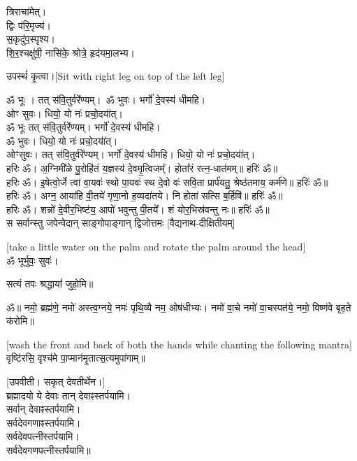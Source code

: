 त्रिराचा॑मेत्।\\
द्विः प॑रि॒मृज्य॑।\\
स॒कृदु॑प॒स्पृश्य।\\
शि॒र॒श्चक्षु॑षी॒ नासि॑के॒ श्रोत्रे॒ हृद॑यमा॒लभ्य।

उपस्थं॑ कृ॒त्वा।{\scriptsize [Sit with right leg on top of the left leg]}

ॐ भूः । तत् स॑वि॒तुर्वरे॑॑ण्यम्।\
ॐ भुवः। भर्गो॑ दे॒वस्य॑ धीमहि।\\
ओꣳ सुवः। धियो॒ यो नः॑ प्रचो॒दया॑॑त्।\\
ॐ भूः तत् स॑वि॒तुर्वरे॑॑ण्यम्। भर्गो॑ दे॒वस्य॑ धीमहि।\\
ॐ भुवः। धियो॒ यो नः॑ प्रचो॒दया॑॑त्।\\
ओꣳसुवः। तत् स॑वि॒तुर्वरे॑॑ण्यम्। भर्गो॑ दे॒वस्य॑ धीमहि। धियो॒ यो नः॑ प्रचो॒दया॑॑त्।\\

हरिः ॐ। अ॒ग्निमी᳚ळे पु॒रोहि॑तं य॒ज्ञस्य॑ दे॒वमृ॒त्विजम्᳚। होता᳚रं रत्न॒-धात॑मम्॥ हरिः॑ ॐ॥\\

हरिः ॐ। इ॒षेत्वो॒र्जे त्वा॑ वा॒यवः॑ स्थो पा॒यवः॑ स्थ दे॒वो वः॑ सवि॒ता प्रार्प॑यतु॒ श्रेष्ठ॑तमाय॒ कर्म॑णे॥ हरिः॑ ॐ॥ \\

हरिः ॐ। अग्न॒ आया॑हि वी॒तये॑ गृणा॒नो ह॒व्यदा॑तये। नि होता॑ सत्सि ब॒र्हिषि॑॥ हरिः॑ ॐ॥\\

हरिः ॐ। शन्नो॑ दे॒वीर॒भिष्ट॑य॒ आपो॑ भवुन्तु पी॒तये᳚। शं योर॒भिस्र॑वन्तु नः॥ हरिः॑ ॐ॥\\

{\centering
{}
{स सर्वान्स्तु जपेन्वेदान् साङ्गोपाङ्गान् द्विजोत्तमः}
}
{\hfill [वैद्यनाथ-दीक्षितीयम्]}

{\scriptsize [take a little water on the palm and rotate the palm around the head]}\\
ॐ भूर्भुवः॒ सुवः॑।

सत्यं तपः श्रद्धायां॑ जुहो॒मि॥


ॐ॥ नमो॒ ब्रह्म॑णे॒ नमो॑ अस्त्व॒ग्नये॒ नमः॑ पृथि॒व्यै नम॒ ओष॑धीभ्यः।
नमो॑ वा॒चे नमो॑ वा॒चस्पत॑ये॒ नमो॒ विष्ण॑वे बृह॒ते क॑रोमि॥

{\scriptsize [wash the front and back of both the hands while chanting the following mantra]}\\
वृष्टि॑रसि॒ वृश्च॑मे पा॒प्मान॑मृ॒तात्स॒त्यमुपा॑गाम्॥

\vspace{-1ex}
{\scriptsize [उपवीती। सकृत् देवतीर्थेन।]}\\
ब्रह्मादयो ये देवाः तान् देवाꣴस्तर्पयामि।\\
सर्वान् देवाꣴस्तर्पयामि।\\
सर्वदेवगणाꣴस्तर्पयामि।\\
सर्वदेवपत्नीस्तर्पयामि।\\
सर्वदेवगणपत्नीस्तर्पयामि॥

